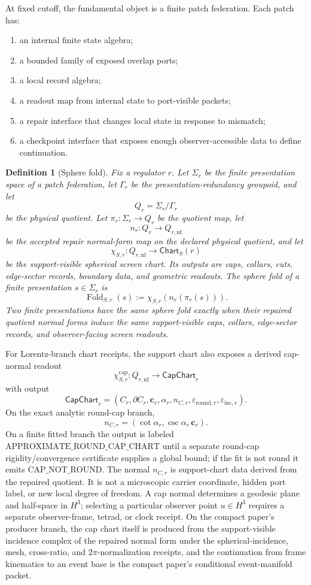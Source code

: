 \documentclass[11pt]{article}
\newtheorem{definition}[theorem]{Definition}
\theoremstyle{remark}
\theoremstyle{plain}
\begin{document}
At fixed cutoff, the fundamental object is a finite patch federation.
Each patch has:
\begin{enumerate}[leftmargin=2em]
\item an internal finite state algebra;
\item a bounded family of exposed overlap ports;
\item a local record algebra;
\item a readout map from internal state to port-visible packets;
\item a repair interface that changes local state in response to mismatch;
\item a checkpoint interface that exposes enough observer-accessible data to define continuation.
\end{enumerate}

\begin{definition}[Sphere fold]\label{def:sphere-fold}
Fix a regulator \(r\). Let \(\Sigma_r\) be the finite presentation space of a patch
federation, let \(\Gamma_r\) be the presentation-redundancy groupoid, and let
\[
Q_r=\Sigma_r/\Gamma_r
\]
be the physical quotient. Let \(\pi_r:\Sigma_r\to Q_r\) be the quotient map, let
\[
n_r:Q_r\to Q_{r,\mathrm{nf}}
\]
be the accepted repair normal-form map on the declared physical quotient, and let
\[
\chi_{S,r}:Q_{r,\mathrm{nf}}\to \mathsf{Chart}_S(r)
\]
be the support-visible spherical screen chart. Its outputs are caps, collars, cuts,
edge-sector records, boundary data, and geometric readouts. The sphere fold of a finite
presentation \(s\in\Sigma_r\) is
\[
\operatorname{Fold}_{S,r}(s)
:=
\chi_{S,r}\!\left(n_r(\pi_r(s))\right).
\]
Two finite presentations have the same sphere fold exactly when their repaired quotient
normal forms induce the same support-visible caps, collars, edge-sector records, and
observer-facing screen readouts.
\end{definition}

For Lorentz-branch chart receipts, the support chart also exposes a derived cap-normal readout
\[
\chi^{\mathrm{cap}}_{S,r}:Q_{r,\mathrm{nf}}\to\mathsf{CapChart}_r
\]
with output
\[
\mathsf{CapChart}_r=
\left(
C_r,\partial C_r,\mathbf c_r,\alpha_r,n_{C,r},
\varepsilon_{\mathrm{round},r},\varepsilon_{\mathrm{inc},r}
\right).
\]
On the exact analytic round-cap branch,
\[
n_{C,r}=(\cot\alpha_r,\csc\alpha_r\,\mathbf c_r).
\]
On a finite fitted branch the output is labeled
\(\mathrm{APPROXIMATE\_ROUND\_CAP\_CHART}\) until a separate
round-cap rigidity/convergence certificate supplies a global bound; if the fit is not round it
emits \(\mathrm{CAP\_NOT\_ROUND}\). The normal \(n_{C,r}\) is support-chart data derived from the
repaired quotient. It is not a microscopic carrier coordinate, hidden port label, or new local
degree of freedom. A cap normal determines a geodesic plane and half-space in \(H^3\); selecting
a particular observer point \(u\in H^3\) requires a separate observer-frame, tetrad, or clock
receipt. On the compact paper's producer branch, the cap chart itself is produced from the
support-visible incidence complex of the repaired normal form under the spherical-incidence,
mesh, cross-ratio, and \(2\pi\)-normalization receipts, and the continuation from frame
kinematics to an event base is the compact paper's conditional event-manifold packet.
\end{document}
